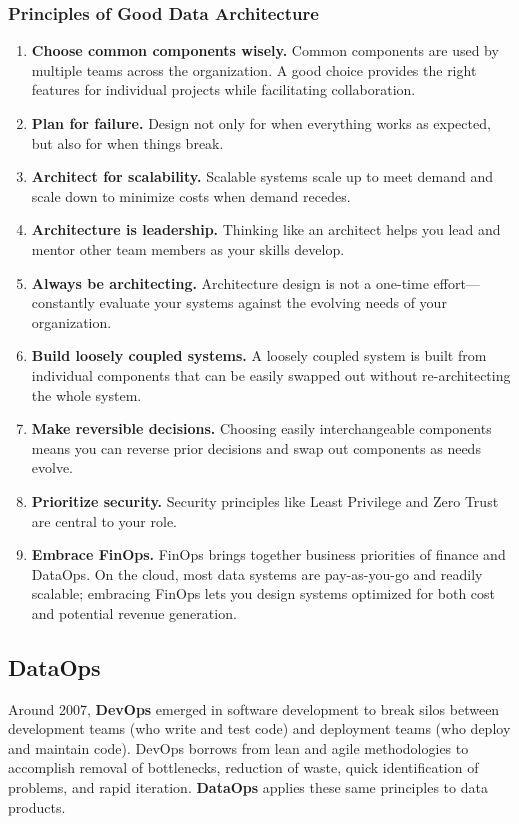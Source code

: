 \documentclass{article}
\begin{document}
\subsubsection{Principles of Good Data Architecture}
\begin{enumerate}
    \item \textbf{Choose common components wisely.} Common components are used by multiple teams across the organization. A good choice provides the right features for individual projects while facilitating collaboration.
    \item \textbf{Plan for failure.} Design not only for when everything works as expected, but also for when things break.
    \item \textbf{Architect for scalability.} Scalable systems scale up to meet demand and scale down to minimize costs when demand recedes.
    \item \textbf{Architecture is leadership.} Thinking like an architect helps you lead and mentor other team members as your skills develop.
    \item \textbf{Always be architecting.} Architecture design is not a one-time effort---constantly evaluate your systems against the evolving needs of your organization.
    \item \textbf{Build loosely coupled systems.} A loosely coupled system is built from individual components that can be easily swapped out without re-architecting the whole system.
    \item \textbf{Make reversible decisions.} Choosing easily interchangeable components means you can reverse prior decisions and swap out components as needs evolve.
    \item \textbf{Prioritize security.} Security principles like Least Privilege and Zero Trust are central to your role.
    \item \textbf{Embrace FinOps.} FinOps brings together business priorities of finance and DataOps. On the cloud, most data systems are pay-as-you-go and readily scalable; embracing FinOps lets you design systems optimized for both cost and potential revenue generation.
\end{enumerate}

\subsection{DataOps}
Around 2007, \textbf{DevOps} emerged in software development to break silos between development teams (who write and test code) and deployment teams (who deploy and maintain code). DevOps borrows from lean and agile methodologies to accomplish removal of bottlenecks, reduction of waste, quick identification of problems, and rapid iteration. \textbf{DataOps} applies these same principles to data products.
\end{document}
